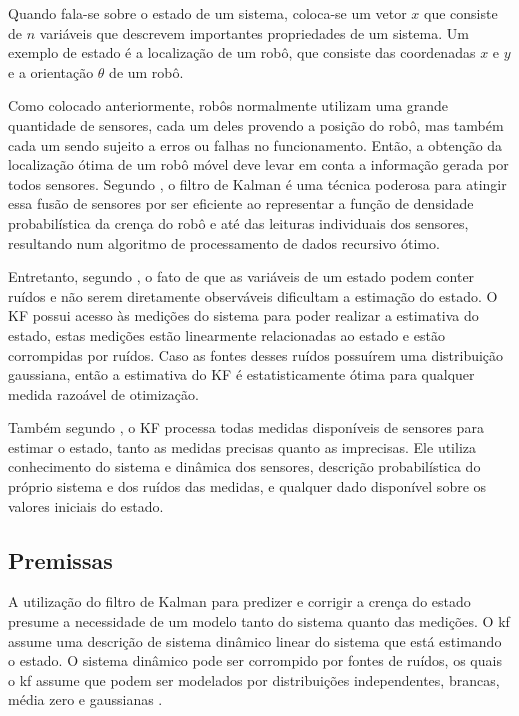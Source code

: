 \documentclass[acronym, symbols, table]{fei}
\begin{document}
			Quando fala-se sobre o estado de um sistema, coloca-se um vetor $x$ que consiste de $n$ variáveis que descrevem importantes propriedades de um sistema. Um exemplo de estado é a localização de um robô, que consiste das coordenadas $x$ e $y$ e a orientação $\theta$ de um robô.
			
			Como colocado anteriormente, robôs normalmente utilizam uma grande quantidade de sensores, cada um deles provendo a posição do robô, mas também cada um sendo sujeito a erros ou falhas no funcionamento. Então, a obtenção da localização ótima de um robô móvel deve levar em conta a informação gerada por todos sensores. Segundo \textcite{siegwart2011introduction}, o filtro de Kalman é uma técnica poderosa para atingir essa fusão de sensores por ser eficiente ao representar a função de densidade probabilística da crença do robô e até das leituras individuais dos sensores, resultando num algoritmo de processamento de dados recursivo ótimo.
			
			Entretanto, segundo \textcite{phdthesisNegenborn}, o fato de que as variáveis de um estado podem conter ruídos e não serem diretamente observáveis dificultam a estimação do estado. O KF possui acesso às medições do sistema para poder realizar a estimativa do estado, estas medições estão linearmente relacionadas ao estado e estão corrompidas por ruídos. Caso as fontes desses ruídos possuírem uma distribuição gaussiana, então a estimativa do KF é estatisticamente ótima para qualquer medida razoável de otimização.
			
			Também segundo \textcite{phdthesisNegenborn}, o KF processa todas medidas disponíveis de sensores para estimar o estado, tanto as medidas precisas quanto as imprecisas. Ele utiliza conhecimento do sistema e dinâmica dos sensores, descrição probabilística do próprio sistema e dos ruídos das medidas, e qualquer dado disponível sobre os valores iniciais do estado.
			
		\subsection{Premissas}
		
			A utilização do filtro de Kalman para predizer e corrigir a crença do estado presume a necessidade de um modelo tanto do sistema quanto das medições. O \acrshort{kf} assume uma descrição de sistema dinâmico linear do sistema que está estimando o estado. O sistema dinâmico pode ser corrompido por fontes de ruídos, os quais o \acrshort{kf} assume que podem ser modelados por distribuições independentes, brancas, média zero e gaussianas \cite{urrea2021kalman}.
			
\end{document}
